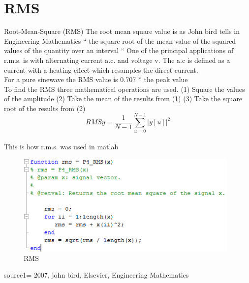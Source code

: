 \section{RMS}
Root-Mean-Square (RMS)
The root mean square value is as John bird tells in Engineering Mathematics \cite{Bird2007
} “ the square root of the mean value of the squared values of the quantity over an interval “
One of the principal applications of r.m.s. is with alternating current a.c. and voltage v. The a.c is defined as a current with a heating effect which resamples the direct current. \cite{Bird2007}
\\
For a pure sinewave the RMS value is 0.707 * the peak value
\\
To find the RMS three mathematical operations are used.
(1)	Square the values of the amplitude
(2)	Take the mean of the results from (1)
(3)	Take the square root of the results from (2)
\begin{equation}\label{eq:RMS formular}
RMSy = \frac{1}{N-1}\sum_{u=0}^{N-1}|y[u]|^2
\end{equation}
\\
This is how r.m.s. was used in matlab
\begin{figure}
	\begin{center}
		\includegraphics[height=5cm]{fig/RMS_matlabCode.png}
		\caption{RMS}
	\end{center}
\end{figure}

source1= 2007, john bird, Elsevier, Engineering Mathematics